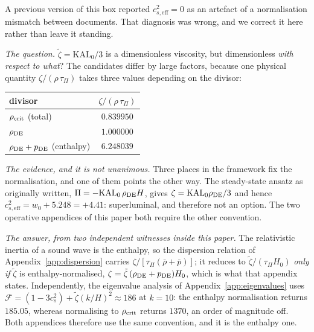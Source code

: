 \documentclass[12pt,a4paper]{article}
\newcommand{\KALz}{\mathrm{KAL}_0}
\newcommand{\wz}{w_0}
\newcommand{\tauPi}{\tau_\Pi}
\newcommand{\ztilde}{\tilde{\zeta}}
\begin{document}
\begin{tcolorbox}[colback=green!4,colframe=green!45!black,
  title={\textbf{Resolved: the normalisation of $\ztilde$ (OP-22, closed 2026-09-06)}}]
A previous version of this box reported $c^2_{s,\mathrm{eff}}=0$ as an artefact
of a normalisation mismatch between documents. That diagnosis was wrong, and we
correct it here rather than leave it standing.

\emph{The question.} $\ztilde=\KALz/3$ is a dimensionless viscosity, but
dimensionless \emph{with respect to what}? The candidates differ by large
factors, because one physical quantity $\zeta/(\rho\,\tauPi)$ takes three values
depending on the divisor:
\begin{center}
\begin{tabular}{lc}
\toprule
divisor & $\zeta/(\rho\,\tauPi)$ \\
\midrule
$\rho_{\rm crit}$ (total)         & $0.839950$ \\
$\rho_{\rm DE}$                   & $1.000000$ \\
$\rho_{\rm DE}+p_{\rm DE}$ (enthalpy) & $6.248039$ \\
\bottomrule
\end{tabular}
\end{center}

\emph{The evidence, and it is not unanimous.} Three places in the framework fix
the normalisation, and one of them points the other way. The steady-state
ansatz as originally written, $\Pi = -\KALz\,\rho_{\rm DE}H$, gives
$\zeta = \KALz\rho_{\rm DE}/3$ and hence
$c^2_{s,\mathrm{eff}} = \wz + 5.248 = +4.41$: superluminal, and therefore not
an option. The two operative appendices of this paper both require the other
convention.

\emph{The answer, from two independent witnesses inside this paper.}
The relativistic inertia of a sound wave is the enthalpy, so the dispersion
relation of Appendix~\ref{app:dispersion} carries
$\zeta/[\tauPi(\bar\rho+\bar p)]$; it reduces to $\ztilde/(\tauPi H_0)$
\emph{only if} $\ztilde$ is enthalpy-normalised, $\zeta =
\ztilde\,(\rho_{\rm DE}+p_{\rm DE})H_0$, which is what that appendix states.
Independently, the eigenvalue analysis of Appendix~\ref{app:eigenvalues} uses
$\mathcal{F}=(1-3c^2_s)+\ztilde(k/H)^2 \approx 186$ at $k=10$: the
enthalpy normalisation returns $185.05$, whereas normalising to $\rho_{\rm crit}$
returns $1370$, an order of magnitude off. Both appendices therefore use the
same convention, and it is the enthalpy one.


\end{tcolorbox}
\end{document}
